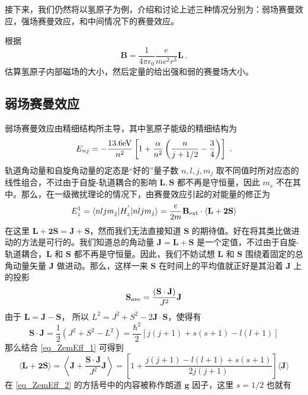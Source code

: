 接下来，我们仍然将以氢原子为例，介绍和讨论上述三种情况分别为：弱场赛曼效应，强场赛曼效应，和中间情况下的赛曼效应。
\begin{exercise}{}
根据
\begin{equation}\label{eq_ZemEff_17}
\mathbf{B}=\frac{1}{4\pi\epsilon_0}\frac{e}{mc^2r^3}\mathbf{L}~.
\end{equation}
估算氢原子内部磁场的大小，然后定量的给出强和弱的赛曼场大小。
\end{exercise}
\subsection{弱场赛曼效应}
弱场赛曼效应由精细结构所主导，其中氢原子能级的精细结构为
\begin{equation}\label{eq_ZemEff_3}
E_{nj}=-\frac{13.6\rm{eV}}{n^2}\left[1+\frac{\alpha}{n^2}\left(\frac{n}{j+1/2}-\frac{3}{4}\right)\right]~.
\end{equation}
轨道角动量和自旋角动量的定态是“好的”量子数 $n,l,j,m_j$ 取不同值时所对应态的线性组合，不过由于自旋-轨道耦合的影响 $\mathbf{L,S}$ 都不再是守恒量，因此 $m_s$ 不在其中。那么，在一级微扰理论的情况下，由赛曼效应引起的对能量的修正为
$$
E_z^{1}=\langle nljm_j|H_z^{'}|nljm_j\rangle=\frac{e}{2m}\mathbf{B}_{\rm{ext}}\cdot\langle\mathbf{L+2S}\rangle
$$
在这里 $\mathbf{L+2S=J+S}$，然而我们无法直接知道 $\mathbf{S}$ 的期待值。好在将其类比做进动的方法是可行的。我们知道总的角动量 $\mathbf{J=L+S}$ 是一个定值，不过由于自旋-轨道耦合，$\mathbf{L}$ 和 $\mathbf{S}$ 都不再是守恒量。因此，我们不妨试想 $\mathbf{L}$ 和 $\mathbf{S}$ 围绕着固定的总角动量矢量 $\mathbf{J}$ 做进动。那么，这样一来 $\mathbf{S}$ 在时间上的平均值就正好是其沿着 $\mathbf{J}$ 上的投影
\begin{equation}\label{eq_ZemEff_1}
\mathbf{S}_{\rm{ave}}=\frac{(\mathbf{S\cdot J})}{J^2}\mathbf{J}
\end{equation}
由于 $\mathbf{L=J-S}$， 所以 $L^2=J^2+S^2-2\mathbf{J\cdot S}$，使得有
\begin{equation}
\mathbf{S\cdot J}=\frac{1}{2}(J^2+S^2-L^2)=\frac{\hbar^2}{2}[j(j+1)+s(s+1)-l(l+1)]
\end{equation}
那么结合 \autoref{eq_ZemEff_1} 可得到
\begin{equation}\label{eq_ZemEff_2}
\langle \mathbf{L+2S}\rangle =\left\langle \mathbf{J}+\frac{\mathbf{S\cdot J}}{J^2}\mathbf{J}\right\rangle=\left[1+\frac{j(j+1)-l(l+1)+s(s+1)}{2j(j+1)}\right]\langle\mathbf{J}\rangle
\end{equation}
在 \autoref{eq_ZemEff_2} 的方括号中的内容被称作朗道 $\mathbf{g}$ 因子，这里 $s=1/2$ 也就有
